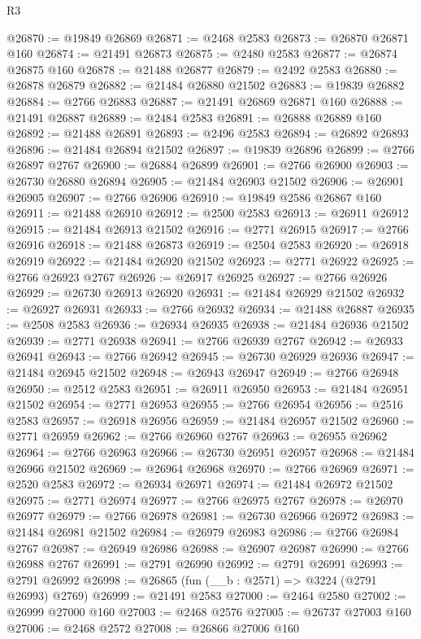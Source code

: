 \begin{lexlean}{R3}
\begin{coremodule}
@26870 := @19849 @26869
@26871 := @2468 @2583
@26873 := @26870 @26871 @160
@26874 := @21491 @26873
@26875 := @2480 @2583
@26877 := @26874 @26875 @160
@26878 := @21488 @26877
@26879 := @2492 @2583
@26880 := @26878 @26879
@26882 := @21484 @26880 @21502
@26883 := @19839 @26882
@26884 := @2766 @26883
@26887 := @21491 @26869 @26871 @160
@26888 := @21491 @26887
@26889 := @2484 @2583
@26891 := @26888 @26889 @160
@26892 := @21488 @26891
@26893 := @2496 @2583
@26894 := @26892 @26893
@26896 := @21484 @26894 @21502
@26897 := @19839 @26896
@26899 := @2766 @26897 @2767
@26900 := @26884 @26899
@26901 := @2766 @26900
@26903 := @26730 @26880 @26894
@26905 := @21484 @26903 @21502
@26906 := @26901 @26905
@26907 := @2766 @26906
@26910 := @19849 @2586 @26867 @160
@26911 := @21488 @26910
@26912 := @2500 @2583
@26913 := @26911 @26912
@26915 := @21484 @26913 @21502
@26916 := @2771 @26915
@26917 := @2766 @26916
@26918 := @21488 @26873
@26919 := @2504 @2583
@26920 := @26918 @26919
@26922 := @21484 @26920 @21502
@26923 := @2771 @26922
@26925 := @2766 @26923 @2767
@26926 := @26917 @26925
@26927 := @2766 @26926
@26929 := @26730 @26913 @26920
@26931 := @21484 @26929 @21502
@26932 := @26927 @26931
@26933 := @2766 @26932
@26934 := @21488 @26887
@26935 := @2508 @2583
@26936 := @26934 @26935
@26938 := @21484 @26936 @21502
@26939 := @2771 @26938
@26941 := @2766 @26939 @2767
@26942 := @26933 @26941
@26943 := @2766 @26942
@26945 := @26730 @26929 @26936
@26947 := @21484 @26945 @21502
@26948 := @26943 @26947
@26949 := @2766 @26948
@26950 := @2512 @2583
@26951 := @26911 @26950
@26953 := @21484 @26951 @21502
@26954 := @2771 @26953
@26955 := @2766 @26954
@26956 := @2516 @2583
@26957 := @26918 @26956
@26959 := @21484 @26957 @21502
@26960 := @2771 @26959
@26962 := @2766 @26960 @2767
@26963 := @26955 @26962
@26964 := @2766 @26963
@26966 := @26730 @26951 @26957
@26968 := @21484 @26966 @21502
@26969 := @26964 @26968
@26970 := @2766 @26969
@26971 := @2520 @2583
@26972 := @26934 @26971
@26974 := @21484 @26972 @21502
@26975 := @2771 @26974
@26977 := @2766 @26975 @2767
@26978 := @26970 @26977
@26979 := @2766 @26978
@26981 := @26730 @26966 @26972
@26983 := @21484 @26981 @21502
@26984 := @26979 @26983
@26986 := @2766 @26984 @2767
@26987 := @26949 @26986
@26988 := @26907 @26987
@26990 := @2766 @26988 @2767
@26991 := @2791 @26990
@26992 := @2791 @26991
@26993 := @2791 @26992
@26998 := @26865 (fun (__b : @2571) => @3224 (@2791 @26993) @2769)
@26999 := @21491 @2583
@27000 := @2464 @2580
@27002 := @26999 @27000 @160
@27003 := @2468 @2576
@27005 := @26737 @27003 @160
@27006 := @2468 @2572
@27008 := @26866 @27006 @160

\end{coremodule}
\end{lexlean}
